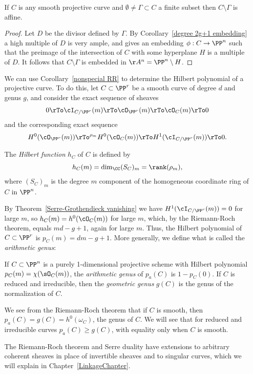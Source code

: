 \begin{corollary}
 If $C$ is any smooth projective curve and $\emptyset \neq \Gamma \subset C$ a finite subset then $C \setminus \Gamma$ is affine.
\end{corollary}
\begin{proof}
Let $D$ be the divisor defined by $\Gamma$. By Corollary~\ref{degree 2g+1 embedding} a high multiple of $D$ is very ample,
and gives an embedding $\phi: C\to \PP^n$ such that the preimage of the intersection of $C$ with some hyperplane $H$
is a multiple of $D$. It follows that $C\setminus \Gamma$ is embedded in $\AA^n = \PP^n\setminus H$.
\end{proof}
 
We can  use Corollary~\ref{nonspecial RR} to determine the Hilbert polynomial of a projective curve. To do this, let $C \subset \PP^r$ be a smooth curve of degree $d$ and genus $g$, and consider the exact sequence of sheaves
$$
0 \rTo \cI_{C/\PP^r}(m) \rTo \cO_{\PP^r}(m) \rTo \cO_C(m) \rTo 0
$$
and the corresponding exact sequence
$$
 H^0(\cO_{\PP^r}(m)) \rTo^{\rho_m} H^0(\cO_C(m)) \rTo H^1(\cI_{C/\PP^r}(m)) \rTo 0.
$$

The \emph{Hilbert function} $h_C$ of $C$  is defined by
$$
h_C(m) = \dim_{\CC} (S_{C})_{m} = \rank(\rho_m),
$$
where $(S_{C})_{m}$ is the degree $m$ component of the homogeneous coordinate ring of $C$ in $\PP^n$.

By Theorem~\ref{Serre-Grothendieck vanishing} we have $H^1(\cI_{C/\PP^r}(m)) = 0$ for large $m$, so $h_{C}(m) = h^0(\cO_C(m))$ for large $m$, which, by the Riemann-Roch theorem, equals $md-g+1$, again for large $m$. Thus, the Hilbert polynomial of $C \subset \PP^r$ is $p_C(m) = dm-g+1$. 
More generally, we define what is called the \emph{arithmetic genus}:

\begin{definition}\label{genus Hilbert}\label{pa}\label{genus formula}
If $C\subset \PP^n$ is a purely 1-dimensional projective scheme with Hilbert polynomial
$p_C(m) = \chi(\sO_C(m))$, the \emph{arithmetic genus} of $p_a(C)$ is $1-p_C(0)$. If $C$ is reduced and irreducible, then
the \emph{geometric genus} $g(C)$ is the genus of the normalization of $C$.
\end{definition}
We see from the Riemann-Roch theorem that if $C$ is smooth, then $p_a(C) = g(C) = h^0(\omega_C)$, the genus of $C$. We
will see that for reduced and irreducible curves $p_a(C) \geq g(C)$, with equality only when $C$ is smooth.
 
The Riemann-Roch theorem and Serre duality have extensions to arbitrary coherent sheaves in place of invertible sheaves 
and to singular curves, which we will explain in Chapter~\ref{LinkageChapter}.

